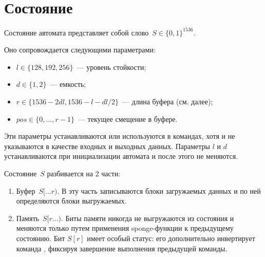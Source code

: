 \section{Состояние}\label{PRG.State}

Состояние автомата представляет собой слово~$S\in\{0,1\}^{1536}$. 

Оно сопровождается следующими параметрами:
\begin{itemize}
\item
$l\in\{128,192,256\}$~--- уровень стойкости;
\item
$d\in\{1,2\}$~--- емкость;
\item
$r\in\{1536-2dl,1536-l-dl/2\}$~--- длина буфера (см. далее);
\item
$pos\in\{0,\ldots,r-1\}$~--- текущее смещение в буфере.
\end{itemize}

Эти параметры устанавливаются или используются в командах, 
хотя и не указываются в качестве входных и выходных данных.
%
Параметры $l$ и $d$ устанавливаются при инициализации автомата и после этого 
не меняются.

Состояние~$S$ разбивается на 2 части: 
\begin{enumerate}
\item
Буфер~$S[\dots r)$.
В эту часть записываются блоки загружаемых данных и по ней определяются 
блоки выгружаемых.
\item
Память~$S[r\dots)$.
Биты памяти никогда не выгружаются из состояния и меняются только путем
применения sponge-функции к предыдущему состоянию.
%
Бит $S[r]$ имеет особый статус: его дополнительно 
инвертирует команда ,
фиксируя завершение выполнения предыдущей команды.
\end{enumerate}


